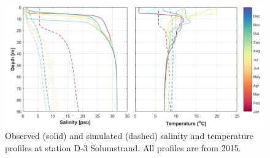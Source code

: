 \begin{figure}[htb]
	\centerline{
		\includegraphics*[trim=0cm 0cm 0cm 0cm,clip=true,width=\textwidth]{Figurer/CTD_D-3}}
	\caption{\small Observed (solid) and simulated (dashed) salinity and temperature profiles at station D-3 Solumstrand. All profiles are from 2015.}
	\label{fig:CTD_D-3}
\end{figure}

